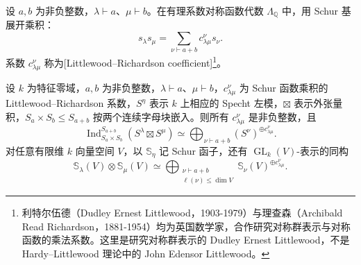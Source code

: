 \begin{definition}\label{b5:def:lr-coefficient}
	设 \(a,b\) 为非负整数，\(\lambda\vdash a\)、\(\mu\vdash b\)。在有理系数对称函数代数 \(\Lambda_{\mathbb Q}\) 中，用 Schur 基展开乘积：
	\[
		s_\lambda s_\mu=\sum_{\nu\vdash a+b}c_{\lambda\mu}^{\nu}s_\nu.
	\]
	系数 \(c_{\lambda\mu}^{\nu}\) 称为[Littlewood--Richardson coefficient]\footnote{利特尔伍德（Dudley Ernest Littlewood，1903-1979）与理查森（Archibald Read Richardson，1881-1954）均为英国数学家，合作研究对称群表示与对称函数的乘法系数。这里是研究对称群表示的 Dudley Ernest Littlewood，不是 Hardy--Littlewood 理论中的 John Edensor Littlewood。}。
\end{definition}

\begin{proposition}\label{b5:prop:schur-tensor-coefficients}
	设 \(k\) 为特征零域，\(a,b\) 为非负整数，\(\lambda\vdash a\)、\(\mu\vdash b\)，\(c_{\lambda\mu}^{\nu}\) 为 Schur 函数乘积的 Littlewood--Richardson 系数，\(S^\eta\) 表示 \(k\) 上相应的 Specht 左模，\(\boxtimes\) 表示外张量积，\(S_a\times S_b\le S_{a+b}\) 按两个连续字母块嵌入。则所有 \(c_{\lambda\mu}^{\nu}\) 是非负整数，且
	\[
		\operatorname{Ind}_{S_a\times S_b}^{S_{a+b}} (S^\lambda\boxtimes S^\mu) \simeq\bigoplus_{\nu\vdash a+b}(S^\nu)^{\oplus c_{\lambda\mu}^{\nu}}.
	\]
	对任意有限维 \(k\) 向量空间 \(V\)，以 \(\mathbb S_\eta\) 记 Schur 函子，还有 \(\operatorname{GL}_k(V)\)-表示的同构
	\begin{equation}\label{b5:eq:schur-tensor-decomposition}
		\mathbb S_\lambda(V)\otimes\mathbb S_\mu(V) \simeq \bigoplus_{\substack{\nu\vdash a+b\\\ell(\nu)\le\dim V}} \mathbb S_\nu(V)^{\oplus c_{\lambda\mu}^{\nu}}.
	\end{equation}
\end{proposition}
